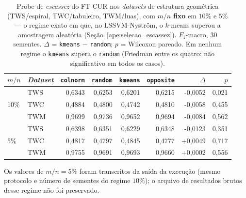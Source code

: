 \begin{table}[ht]
  \centering
  \caption{Probe de \emph{escassez} do FT-CUR nos \textit{datasets} de estrutura geométrica (TWS/espiral, TWC/tabuleiro, TWM/luas), com $m/n$ \textbf{fixo} em $10\%$ e $5\%$ --- o regime exato em que, no LSSVM-Nyström, o $k$-means superou a amostragem aleatória (Seção~\ref{ape:selecao_escassez}). $F_1$-macro, 30 sementes. $\Delta$ = \texttt{kmeans} $-$ \texttt{random}; $p$ = Wilcoxon pareado. Em nenhum regime o \texttt{kmeans} supera o \texttt{random} (Friedman entre os quatro: não significativo em todos os casos).}
  \label{tab:app_ftcur_scarcity}
  \begin{tabular}{llrrrrrr}
    \toprule
    $m/n$ & \emph{Dataset} & \texttt{colnorm} & \texttt{random} & \texttt{kmeans} & \texttt{opposite} & $\Delta$ & $p$ \\
    \midrule
    \multirow{3}{*}{10\%} & TWS & 0,6343 & 0,6253 & 0,6201 & 0,6215 & -0,0052 & 0,021 \\
     & TWC & 0,4884 & 0,4800 & 0,4742 & 0,4810 & -0,0058 & 0,455 \\
     & TWM & 0,9699 & 0,9736 & 0,9652 & 0,9694 & -0,0084 & 0,562 \\
    \midrule
    \multirow{3}{*}{5\%} & TWS & 0,6398 & 0,6351 & 0,6229 & 0,6348 & -0,0123 & 0,351 \\
     & TWC & 0,4817 & 0,4797 & 0,4845 & 0,4777 & +0,0049 & 0,717 \\
     & TWM & 0,9755 & 0,9691 & 0,9693 & 0,9660 & +0,0002 & 0,556 \\
    \bottomrule
  \end{tabular}
  \par\smallskip\footnotesize Os valores de $m/n=5\%$ foram transcritos da saída da execução (mesmo protocolo e número de sementes do regime $10\%$); o arquivo de resultados brutos desse regime não foi preservado.
\end{table}
